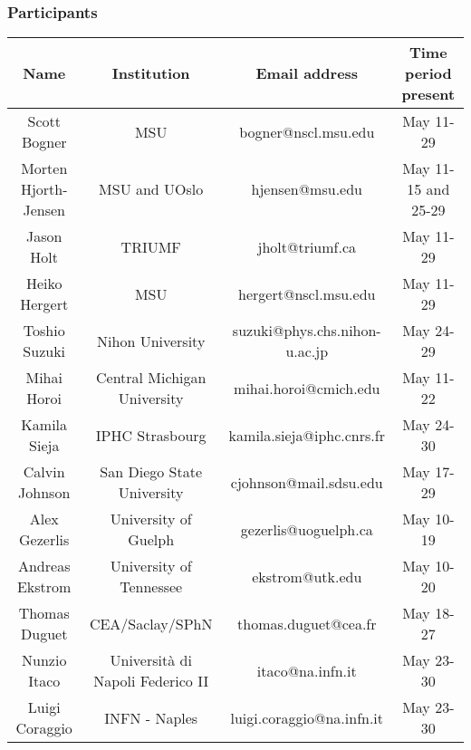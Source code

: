 \documentclass{beamer}
\begin{document}
\begin{frame}
\frametitle{Participants}

\begin{block}{}


{\footnotesize
\begin{tabular}{cccc}
\hline
\multicolumn{1}{c}{ Name } & \multicolumn{1}{c}{ Institution } & \multicolumn{1}{c}{ Email address } & \multicolumn{1}{c}{ Time period  present } \\
\hline
Scott Bogner         & MSU                                    & bogner@nscl.msu.edu                & May 11-29            \\
Morten Hjorth-Jensen & MSU and UOslo                          & hjensen@msu.edu                    & May 11-15 and 25-29  \\
Jason Holt           & TRIUMF                                 & jholt@triumf.ca                    & May 11-29            \\
Heiko Hergert        & MSU                                    & hergert@nscl.msu.edu               & May 11-29            \\
Toshio Suzuki        & Nihon University                       & suzuki@phys.chs.nihon-u.ac.jp      & May 24-29            \\
Mihai Horoi          & Central Michigan University            & mihai.horoi@cmich.edu              & May 11-22            \\
Kamila Sieja         & IPHC Strasbourg                        & kamila.sieja@iphc.cnrs.fr          & May 24-30            \\
Calvin Johnson       & San Diego State University             & cjohnson@mail.sdsu.edu             & May 17-29            \\
Alex Gezerlis        & University of Guelph                   & gezerlis@uoguelph.ca               & May 10-19            \\
Andreas Ekstrom      & University of Tennessee                & ekstrom@utk.edu                    & May 10-20            \\
Thomas	Duguet        & CEA/Saclay/SPhN                        & thomas.duguet@cea.fr               & May 18-27            \\
Nunzio Itaco         & Università di Napoli Federico II      & itaco@na.infn.it                   & May 23-30            \\
Luigi Coraggio       & INFN - Naples                          & luigi.coraggio@na.infn.it          & May 23-30            \\

\end{tabular}}
\end{block}
\end{frame}
\end{document}
